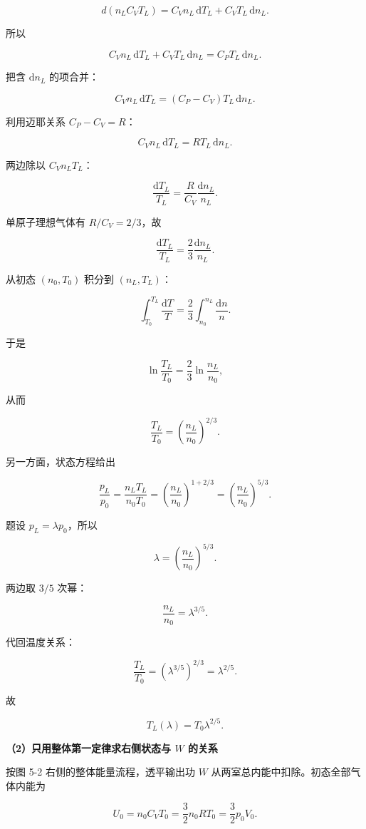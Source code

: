 \documentclass[12pt,a4paper,UTF8]{ctexart}
\begin{document}
\[
d(n_LC_VT_L)
=C_Vn_L\,\mathrm{d}T_L+C_VT_L\,\mathrm{d}n_L.
\]

所以

\[
C_Vn_L\,\mathrm{d}T_L+C_VT_L\,\mathrm{d}n_L
=C_PT_L\,\mathrm{d}n_L.
\]

把含 \(\mathrm{d}n_L\) 的项合并：

\[
C_Vn_L\,\mathrm{d}T_L
=(C_P-C_V)T_L\,\mathrm{d}n_L.
\]

利用迈耶关系 \(C_P-C_V=R\)：

\[
C_Vn_L\,\mathrm{d}T_L=RT_L\,\mathrm{d}n_L.
\]

两边除以 \(C_Vn_LT_L\)：

\[
\frac{\mathrm{d}T_L}{T_L}
=\frac{R}{C_V}\frac{\mathrm{d}n_L}{n_L}.
\]

单原子理想气体有 \(R/C_V=2/3\)，故

\[
\frac{\mathrm{d}T_L}{T_L}=\frac23\frac{\mathrm{d}n_L}{n_L}.
\]

从初态 \((n_0,T_0)\) 积分到 \((n_L,T_L)\)：

\[
\int_{T_0}^{T_L}\frac{\mathrm{d}T}{T}
=\frac23\int_{n_0}^{n_L}\frac{\mathrm{d}n}{n}.
\]

于是

\[
\ln\frac{T_L}{T_0}
=\frac23\ln\frac{n_L}{n_0},
\]

从而

\[
\frac{T_L}{T_0}
=\left(\frac{n_L}{n_0}\right)^{2/3}.
\]

另一方面，状态方程给出

\[
\frac{p_L}{p_0}
=\frac{n_LT_L}{n_0T_0}
=\left(\frac{n_L}{n_0}\right)^{1+2/3}
=\left(\frac{n_L}{n_0}\right)^{5/3}.
\]

题设 \(p_L=\lambda p_0\)，所以

\[
\lambda=\left(\frac{n_L}{n_0}\right)^{5/3}.
\]

两边取 \(3/5\) 次幂：

\[
\boxed{\frac{n_L}{n_0}=\lambda^{3/5}}.
\]

代回温度关系：

\[
\frac{T_L}{T_0}
=\left(\lambda^{3/5}\right)^{2/3}
=\lambda^{2/5}.
\]

故

\[\boxed{T_L(\lambda)=T_0\lambda^{2/5}}.\]

\textbf{（2）只用整体第一定律求右侧状态与 \(W\) 的关系}

按图 5-2 右侧的整体能量流程，透平输出功 \(W\)
从两室总内能中扣除。初态全部气体内能为

\[
U_0=n_0C_VT_0
=\frac32n_0RT_0
=\frac32p_0V_0.
\]
\end{document}
